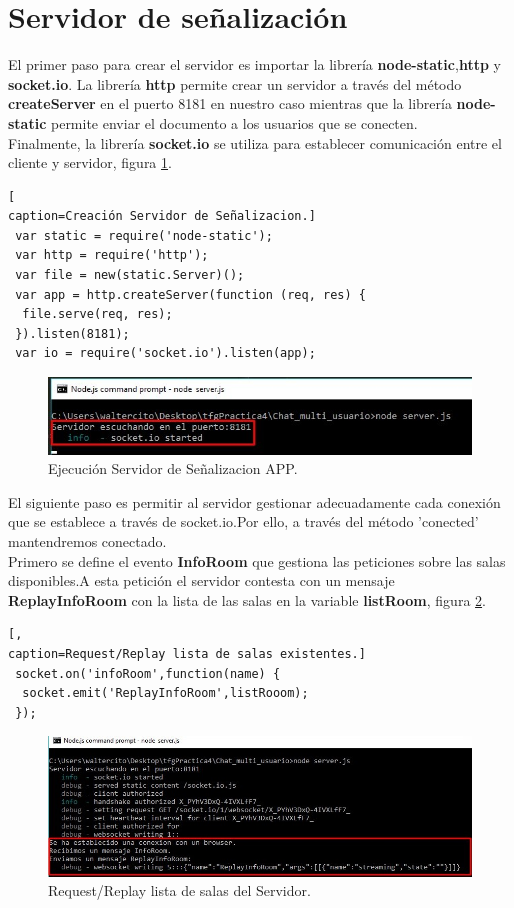\section{Servidor de señalización}
El primer paso para crear el servidor es importar la librería \textbf{node-static},\textbf{http} y \textbf{socket.io}. La librería \textbf{http} permite crear un servidor a través del método \textbf{createServer} en el puerto 8181 en nuestro caso mientras que la librería \textbf{node-static} permite enviar el documento a los usuarios que se conecten.
\\Finalmente, la librería \textbf{socket.io} se utiliza para establecer comunicación entre el cliente y servidor, figura \ref{fig:EjecucionServer}.
\begin{lstlisting}[
caption=Creación Servidor de Señalizacion.]
 var static = require('node-static');
 var http = require('http');
 var file = new(static.Server)();
 var app = http.createServer(function (req, res) {
  file.serve(req, res);
 }).listen(8181);
 var io = require('socket.io').listen(app);
\end{lstlisting}
\begin{figure}[!h]
\begin{center}
   \includegraphics[width=0.8\linewidth]{Figures/InicioServidor}
	\decoRule
	\caption[ServidorSeñalizacion]{Ejecución Servidor de Señalizacion APP.}
\label{fig:EjecucionServer}
\end{center}
\end{figure}
El siguiente paso es permitir al servidor gestionar adecuadamente cada conexión que se establece a través de socket.io.Por ello, a través del método 'conected' mantendremos conectado.
\\Primero se define el evento \textbf{InfoRoom} que gestiona las peticiones sobre las salas disponibles.A esta petición el servidor contesta con un mensaje \textbf{ReplayInfoRoom} con la lista de las salas en la variable \textbf{listRoom}, figura \ref{fig:EjecucionInfoRoom}.
\begin{lstlisting}[,
caption=Request/Replay lista de salas existentes.]
 socket.on('infoRoom',function(name) {
  socket.emit('ReplayInfoRoom',listRooom);
 });
\end{lstlisting}
\begin{figure}[!h]
\begin{center}
   \includegraphics[width=0.8\linewidth]{Figures/InfoRoomServer}
	\decoRule
	\caption[Request/Replay Salas Servidor]{Request/Replay lista de salas del Servidor.}
\label{fig:EjecucionInfoRoom}
\end{center}
\end{figure}
